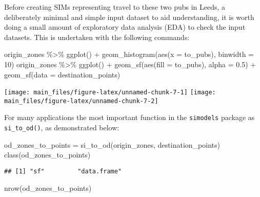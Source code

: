 \documentclass[11pt,letterpaper]{article}
\newenvironment{Shaded}{\begin{snugshade}}{\end{snugshade}}
\newcommand{\AttributeTok}[1]{\textcolor[rgb]{0.77,0.63,0.00}{#1}}
\newcommand{\DecValTok}[1]{\textcolor[rgb]{0.00,0.00,0.81}{#1}}
\newcommand{\FloatTok}[1]{\textcolor[rgb]{0.00,0.00,0.81}{#1}}
\newcommand{\FunctionTok}[1]{\textcolor[rgb]{0.00,0.00,0.00}{#1}}
\newcommand{\NormalTok}[1]{#1}
\newcommand{\OtherTok}[1]{\textcolor[rgb]{0.56,0.35,0.01}{#1}}
\newcommand{\SpecialCharTok}[1]{\textcolor[rgb]{0.00,0.00,0.00}{#1}}
\begin{document}
Before creating SIMs representing travel to these two pubs in Leeds, a deliberately minimal and simple input dataset to aid understanding, it is worth doing a small amount of exploratory data analysis (EDA) to check the input datasets.
This is undertaken with the following commands:

\begin{Shaded}
\begin{Highlighting}[]
\NormalTok{origin\_zones }\SpecialCharTok{\%\textgreater{}\%} 
  \FunctionTok{ggplot}\NormalTok{() }\SpecialCharTok{+}
  \FunctionTok{geom\_histogram}\NormalTok{(}\FunctionTok{aes}\NormalTok{(}\AttributeTok{x =}\NormalTok{ to\_pubs), }\AttributeTok{binwidth =} \DecValTok{10}\NormalTok{)}
\NormalTok{origin\_zones }\SpecialCharTok{\%\textgreater{}\%} 
  \FunctionTok{ggplot}\NormalTok{() }\SpecialCharTok{+}
  \FunctionTok{geom\_sf}\NormalTok{(}\FunctionTok{aes}\NormalTok{(}\AttributeTok{fill =}\NormalTok{ to\_pubs), }\AttributeTok{alpha =} \FloatTok{0.5}\NormalTok{) }\SpecialCharTok{+}
  \FunctionTok{geom\_sf}\NormalTok{(}\AttributeTok{data =}\NormalTok{ destination\_points)}
\end{Highlighting}
\end{Shaded}

\texttt{[image: main\_files/figure-latex/unnamed-chunk-7-1]} \texttt{[image: main\_files/figure-latex/unnamed-chunk-7-2]}

For many applications the most important function in the \texttt{simodels} package as \texttt{si\_to\_od()}, as demonstrated below:

\begin{Shaded}
\begin{Highlighting}[]
\NormalTok{od\_zones\_to\_points }\OtherTok{=} \FunctionTok{si\_to\_od}\NormalTok{(origin\_zones, destination\_points)}
\FunctionTok{class}\NormalTok{(od\_zones\_to\_points)}
\end{Highlighting}
\end{Shaded}

\begin{verbatim}
## [1] "sf"         "data.frame"
\end{verbatim}

\begin{Shaded}
\begin{Highlighting}[]
\FunctionTok{nrow}\NormalTok{(od\_zones\_to\_points)}
\end{Highlighting}
\end{Shaded}
\end{document}

